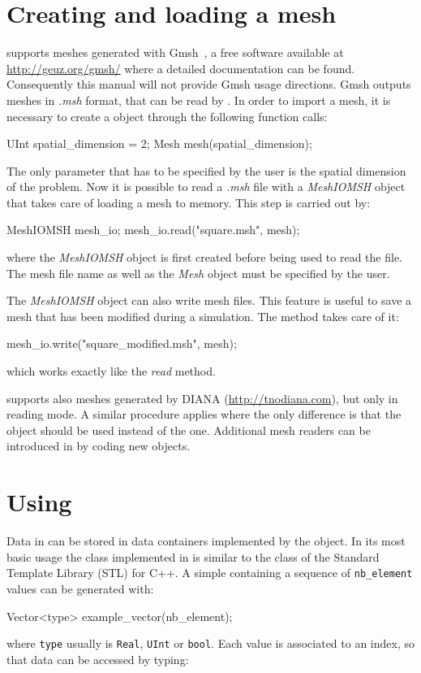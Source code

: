\section{Creating and loading a mesh\label{sect:common:mesh}}

\akantu supports meshes generated with Gmsh~\cite{gmsh}, a free
software available at \url{http://geuz.org/gmsh/} where a detailed
documentation can be found. Consequently this manual will not provide
Gmsh usage directions. Gmsh outputs meshes in \textit{.msh} format, that can be read
by \akantu. In order to import a mesh, it is necessary to create
a  object through the following function calls:
\begin{cpp}
  UInt spatial_dimension = 2;
  Mesh mesh(spatial_dimension);
\end{cpp}
The only parameter that has to be specified by the user is the spatial
dimension of the problem. Now it is possible to read a \textit{.msh} file with
a \textit{MeshIOMSH} object that takes care of loading a mesh to memory.
This step is carried out by:
\begin{cpp}
  MeshIOMSH mesh_io;
  mesh_io.read("square.msh", mesh);
\end{cpp}
where the \textit{MeshIOMSH} object is first created before being
used to read the  file. The mesh file name as well as the \textit{Mesh}
object must be specified by the user.

The \textit{MeshIOMSH} object can also write mesh files. This feature
is useful to save a mesh that has been modified during a
simulation. The  method takes care of it:
\begin{cpp}
  mesh_io.write("square_modified.msh", mesh);
\end{cpp}
which works exactly like the \textit{read} method.

\akantu supports also meshes generated by
DIANA (\url{http://tnodiana.com}), but only in reading mode. A similar
procedure applies where the only
difference is that the  object should be used
instead of the  one. Additional mesh readers can be
introduced in \akantu by coding new  objects.

\section{Using }

Data in \akantu can be stored in data containers implemented by
the  object. In its most basic usage the  class
implemented in \akantu is similar to the  class of
the Standard Template Library (STL) for C++. A simple 
containing a sequence of \texttt{nb\_element} values can be generated with:
\begin{cpp}
  Vector<type> example_vector(nb_element);
\end{cpp}
where \texttt{type} usually is \texttt{Real}, \texttt{UInt} or
\texttt{bool}. Each value is associated to an index, so that data can be
accessed by typing:

